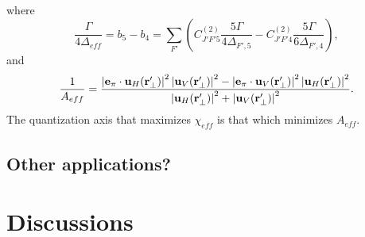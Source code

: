 \documentclass[preprint,aps,pra,onecolumn]{revtex4-1} %
\begin{document}
where
\begin{equation} 
\frac{\Gamma}{4\Delta_{eff}} = b_5 - b_4 = \sum_{F'}  \left( C^{(2)}_{J'F'5}\frac{5\Gamma}{4\Delta_{F',5}} -  C^{(2)}_{J'F'4}\frac{5\Gamma}{6 \Delta_{F',4} } \right),
\end{equation}
and
\begin{equation}
\frac{1}{A_{eff}} = \frac{\left|\mathbf{e}_\pi \cdot \mathbf{u}_H(\mathbf{r}'_\perp)\right|^2 \left|\mathbf{u}_V(\mathbf{r}'_\perp)\right|^2 - 
\left|\mathbf{e}_\pi \cdot \mathbf{u}_V(\mathbf{r}'_\perp)\right|^2 \left|\mathbf{u}_H(\mathbf{r}'_\perp)\right|^2}
{ \left|\mathbf{u}_H(\mathbf{r}'_\perp)\right|^2 +\left|\mathbf{u}_V(\mathbf{r}'_\perp)\right|^2 }.
\end{equation}
The quantization axis that maximizes $\chi_{eff}$ is that which minimizes $A_{eff}$.




\subsection{Other applications?} 


\section{Discussions}




%
%


%	
%	
\end{document}

